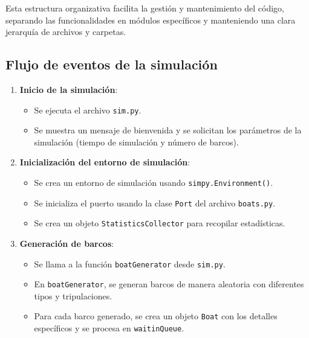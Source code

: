 \documentclass[12pt]{article}
\begin{document}
    Esta estructura organizativa facilita la gestión y mantenimiento del código, separando las funcionalidades en módulos específicos y manteniendo una clara jerarquía de archivos y carpetas.

    \subsection{Flujo de eventos de la simulación}

\begin{enumerate}
    \item \textbf{Inicio de la simulación}:
    \begin{itemize}
        \item Se ejecuta el archivo \texttt{sim.py}.
        \item Se muestra un mensaje de bienvenida y se solicitan los parámetros de la simulación (tiempo de simulación y número de barcos).
    \end{itemize}
    
    \item \textbf{Inicialización del entorno de simulación}:
    \begin{itemize}
        \item Se crea un entorno de simulación usando \texttt{simpy.Environment()}.
        \item Se inicializa el puerto usando la clase \texttt{Port} del archivo \texttt{boats.py}.
        \item Se crea un objeto \texttt{StatisticsCollector} para recopilar estadísticas.
    \end{itemize}
    
    \item \textbf{Generación de barcos}:
    \begin{itemize}
        \item Se llama a la función \texttt{boatGenerator} desde \texttt{sim.py}.
        \item En \texttt{boatGenerator}, se generan barcos de manera aleatoria con diferentes tipos y tripulaciones.
        \item Para cada barco generado, se crea un objeto \texttt{Boat} con los detalles específicos y se procesa en \texttt{waitinQueue}.
    \end{itemize}
    

\end{enumerate}
\end{document}
